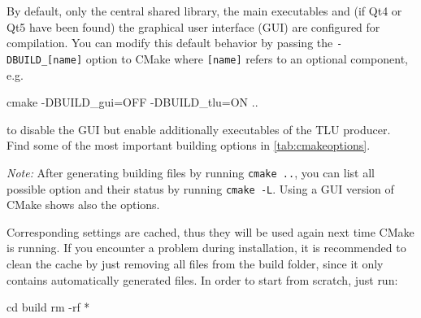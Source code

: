 By default, only the central shared library, the main executables and (if Qt4 or Qt5 have been found) the graphical user interface (GUI) are configured for compilation. 
You can modify this default behavior by passing the \texttt{-DBUILD\_[name]} option to
CMake where \texttt{[name]} refers to an optional component, e.g.
\begin{listing}[mybash]
cmake -DBUILD_gui=OFF -DBUILD_tlu=ON ..
\end{listing}
to disable the GUI but enable additionally executables of the TLU producer.
Find some of the most important building options in \autoref{tab:cmakeoptions}.

\textit{Note:} After generating building files by running \texttt{cmake ..}, you can list all possible option and their status by running \texttt{cmake -L}. 
Using a GUI version of CMake shows also the options.   




Corresponding settings are cached, thus they will be used again next time CMake is running.
If you encounter a problem during installation, it is recommended to clean the cache by just removing all files from the build folder, since it only contains automatically generated files. 
In order to start from scratch, just run:
\begin{listing}[mybash]
cd build
rm -rf *
\end{listing}




